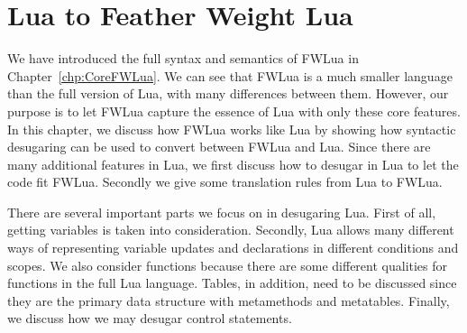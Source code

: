 \newcommand{\desugar}[2]{{#1} & \xlongequal[]{def} & {\begin{array}{@{}l@{}} #2 \end{array}}\\}

\newcommand{\definefunc}[2]{{#1} & \xlongequal[]{} & {\begin{array}{@{}l@{}} #2 \end{array}}\\}

\newcommand{\desugarline}[1]{ & & {\begin{array}{@{}l@{}} #1 \end{array}}\\}

\newcommand{\translate}[2]{\llbracket {#1} \rrbracket & \xlongequal[]{} & {\begin{array}{@{}l@{}} #2 \end{array}}\\}
\newcommand{\translateline}[1]{ &  & {\begin{array}{@{}l@{}} #1 \end{array}}\\}

\chapter{Lua to Feather Weight Lua}
\label{chp:luaTranslation}

We have introduced the full syntax and semantics of FWLua in Chapter~\ref{chp:CoreFWLua}. We can see that FWLua is a much smaller language than the full version of Lua, with many differences between them.
However, our purpose is to let FWLua capture the essence of Lua with only these core features.
In this chapter, we discuss how FWLua works like Lua by showing how syntactic desugaring can be used to convert between FWLua and Lua. Since there are many additional features in Lua, we first discuss how to desugar in Lua to let the code fit FWLua. Secondly we give some translation rules from Lua to FWLua.

There are several important parts we focus on in desugaring Lua. First of all, getting variables is taken into consideration. Secondly, Lua allows many different ways of representing variable updates and declarations in different conditions and scopes. We also consider functions because there are some different qualities for functions in the full Lua language. Tables, in addition, need to be discussed since they are the primary data structure with metamethods and metatables. Finally, we discuss how we may desugar control statements. 

